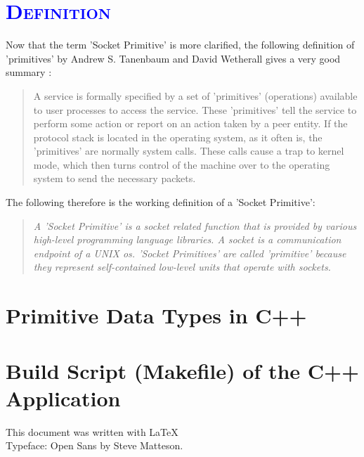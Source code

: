 \documentclass[xcolor=dvipsnames]{article}
\begin{document}
\section{\scshape{\textcolor{blue}{Definition}}} \label{definition}

Now that the term 'Socket Primitive' is more clarified, the following definition of 'primitives' by Andrew S. Tanenbaum and David Wetherall gives a very good summary \cite[p. 38, ch. 1.3.4]{computer_networks}:

\begin{quote}
A service is formally specified by a set of 'primitives' (operations) available to user processes to access the service. These 'primitives' tell the service to perform some action or report on an action taken by a peer entity. If the protocol stack is located in the operating system, as it often is, the 'primitives' are normally system calls. These calls cause a trap to kernel mode, which then turns control of the machine over to the operating system to send the necessary packets.
\end{quote}

\noindent The following therefore is the working definition of a 'Socket Primitive':

\begin{quote}

\textit{A 'Socket Primitive' is a socket related function that is provided by various high-level programming language libraries. A socket is a communication endpoint of a UNIX \gls{os}. 'Socket Primitives' are called 'primitive' because they represent self-contained low-level units that operate with sockets.}

\end{quote}

\newpage

\begin{appendix}

\section{Primitive Data Types in C++}\label{c++_data_types}



\newpage

\section{Build Script (Makefile) of the C++ Application}\label{makefile}



\end{appendix}

\newpage

\printnoidxglossaries




\vfill
\begin{center}
This document was written with \LaTeX 
\\Typeface: Open Sans by Steve Matteson.
\end{center}

\end{document}

